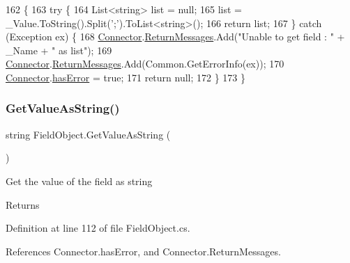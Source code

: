 \begin{DoxyCode}
162                                          \{
163         \textcolor{keywordflow}{try} \{
164             List<string> list = null;
165             list = \_Value.ToString().Split(\textcolor{charliteral}{';'}).ToList<\textcolor{keywordtype}{string}>();
166             \textcolor{keywordflow}{return} list;
167         \} \textcolor{keywordflow}{catch} (Exception ex) \{
168             \hyperlink{class_connector}{Connector}.\hyperlink{class_connector_a1ed422674b344524fd77998dcf6a9ba6}{ReturnMessages}.Add(\textcolor{stringliteral}{"Unable to get field : "} + \_Name + \textcolor{stringliteral}{" as
       list"});
169             \hyperlink{class_connector}{Connector}.\hyperlink{class_connector_a1ed422674b344524fd77998dcf6a9ba6}{ReturnMessages}.Add(Common.GetErrorInfo(ex));
170             \hyperlink{class_connector}{Connector}.\hyperlink{class_connector_a079bae21a5417efa53bfe8954c0f533f}{hasError} = \textcolor{keyword}{true};
171             \textcolor{keywordflow}{return} null;
172         \}
173      \}
\end{DoxyCode}
\mbox{\label{class_field_object_ad223b04d429de4b2c57838ffb41d124b}} 
\subsubsection{\texorpdfstring{Get\+Value\+As\+String()}{GetValueAsString()}}
{\footnotesize\ttfamily string Field\+Object.\+Get\+Value\+As\+String (\begin{DoxyParamCaption}{ }\end{DoxyParamCaption})}



Get the value of the field as string 

\begin{DoxyReturn}{Returns}

\end{DoxyReturn}


Definition at line 112 of file Field\+Object.\+cs.



References Connector.\+has\+Error, and Connector.\+Return\+Messages.


